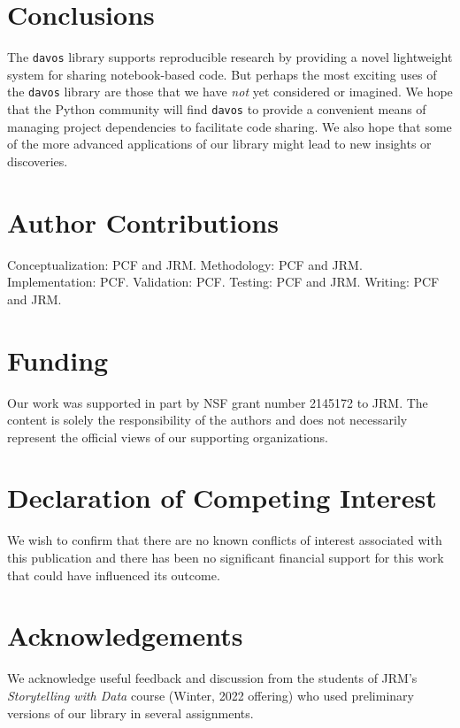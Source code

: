 \documentclass[preprint,12pt, a4paper]{elsarticle}
\begin{document}
\section{Conclusions}

The \texttt{davos} library supports reproducible research by providing
a novel lightweight system for sharing notebook-based code.  But
perhaps the most exciting uses of the \texttt{davos} library are those
that we have \textit{not} yet considered or imagined.  We hope that
the Python community will find \texttt{davos} to provide a convenient
means of managing project dependencies to facilitate code sharing.  We
also hope that some of the more advanced applications of our library
might lead to new insights or discoveries.


\section*{Author Contributions}
Conceptualization: PCF and JRM.  Methodology: PCF and JRM.
Implementation: PCF.  Validation: PCF.  Testing: PCF and JRM.
Writing: PCF and JRM.

\section*{Funding}
Our work was supported in part by NSF grant number 2145172 to JRM.
The content is solely the responsibility of the authors and does not necessarily represent the official views of our supporting organizations.


\section*{Declaration of Competing Interest}
We wish to confirm that there are no known conflicts of interest associated with this publication and there has been no significant financial support for this work that could have influenced its outcome.


\section*{Acknowledgements}
We acknowledge useful feedback and discussion from the students of
JRM's \textit{Storytelling with Data} course (Winter, 2022 offering)
who used preliminary versions of our library in several assignments.



\end{document}
